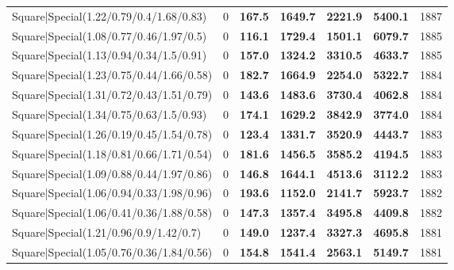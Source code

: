 \begin{tabular}{lrllllr}
 Square|Special(1.22/0.79/0.4/1.68/0.83)                       &             0   & \textbf{167.5} & \textbf{1649.7} & \textbf{2221.9} & \textbf{5400.1} &         1887 \\
 Square|Special(1.08/0.77/0.46/1.97/0.5)                       &             0   & \textbf{116.1} & \textbf{1729.4} & \textbf{1501.1} & \textbf{6079.7} &         1885 \\
 Square|Special(1.13/0.94/0.34/1.5/0.91)                       &             0   & \textbf{157.0} & \textbf{1324.2} & \textbf{3310.5} & \textbf{4633.7} &         1885 \\
 Square|Special(1.23/0.75/0.44/1.66/0.58)                      &             0   & \textbf{182.7} & \textbf{1664.9} & \textbf{2254.0} & \textbf{5322.7} &         1884 \\
 Square|Special(1.31/0.72/0.43/1.51/0.79)                      &             0   & \textbf{143.6} & \textbf{1483.6} & \textbf{3730.4} & \textbf{4062.8} &         1884 \\
 Square|Special(1.34/0.75/0.63/1.5/0.93)                       &             0   & \textbf{174.1} & \textbf{1629.2} & \textbf{3842.9} & \textbf{3774.0} &         1884 \\
 Square|Special(1.26/0.19/0.45/1.54/0.78)                      &             0   & \textbf{123.4} & \textbf{1331.7} & \textbf{3520.9} & \textbf{4443.7} &         1883 \\
 Square|Special(1.18/0.81/0.66/1.71/0.54)                      &             0   & \textbf{181.6} & \textbf{1456.5} & \textbf{3585.2} & \textbf{4194.5} &         1883 \\
 Square|Special(1.09/0.88/0.44/1.97/0.86)                      &             0   & \textbf{146.8} & \textbf{1644.1} & \textbf{4513.6} & \textbf{3112.2} &         1883 \\
 Square|Special(1.06/0.94/0.33/1.98/0.96)                      &             0   & \textbf{193.6} & \textbf{1152.0} & \textbf{2141.7} & \textbf{5923.7} &         1882 \\
 Square|Special(1.06/0.41/0.36/1.88/0.58)                      &             0   & \textbf{147.3} & \textbf{1357.4} & \textbf{3495.8} & \textbf{4409.8} &         1882 \\
 Square|Special(1.21/0.96/0.9/1.42/0.7)                        &             0   & \textbf{149.0} & \textbf{1237.4} & \textbf{3327.3} & \textbf{4695.8} &         1881 \\
 Square|Special(1.05/0.76/0.36/1.84/0.56)                      &             0   & \textbf{154.8} & \textbf{1541.4} & \textbf{2563.1} & \textbf{5149.7} &         1881 \\

\end{tabular}
